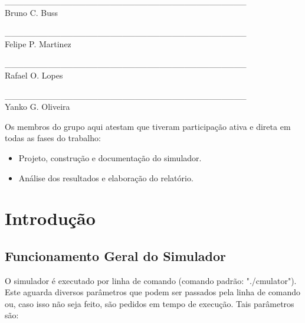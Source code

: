 \documentclass[a4paper,10pt]{article}
\begin{document}
\pagebreak


\begin{center}
\vspace{1cm}

\large

\_\_\_\_\_\_\_\_\_\_\_\_\_\_\_\_\_\_\_\_\_\_\_\_\_\_\_\_\_\_\_\_\_\_\_\_\_\_\_\\
Bruno C. Buss

\vspace{0.5cm}

\_\_\_\_\_\_\_\_\_\_\_\_\_\_\_\_\_\_\_\_\_\_\_\_\_\_\_\_\_\_\_\_\_\_\_\_\_\_\_\\
Felipe P. Martinez

\vspace{0.5cm}

\_\_\_\_\_\_\_\_\_\_\_\_\_\_\_\_\_\_\_\_\_\_\_\_\_\_\_\_\_\_\_\_\_\_\_\_\_\_\_\\
Rafael O. Lopes

\vspace{0.5cm}

\_\_\_\_\_\_\_\_\_\_\_\_\_\_\_\_\_\_\_\_\_\_\_\_\_\_\_\_\_\_\_\_\_\_\_\_\_\_\_\\
Yanko G. Oliveira

\vspace{0.5cm}

\vspace{1cm}

\normalsize
\end{center}

Os membros do grupo aqui atestam que tiveram participação ativa e direta em todas as fases do trabalho:
\begin{itemize}
	\item Projeto, construção e documentação do simulador.
	\item Análise dos resultados e elaboração do relatório.
\end{itemize}


\pagebreak



\tableofcontents
\pagebreak

\listoffigures
\pagebreak

\section{Introdução}
\subsection{Funcionamento Geral do Simulador}
    O simulador é executado por linha de comando (comando padrão: "./cmulator"). Este aguarda diversos parâmetros que podem ser passados pela linha de comando ou, caso isso não seja feito, são pedidos em tempo de execução. Tais parâmetros são:
\end{document}
